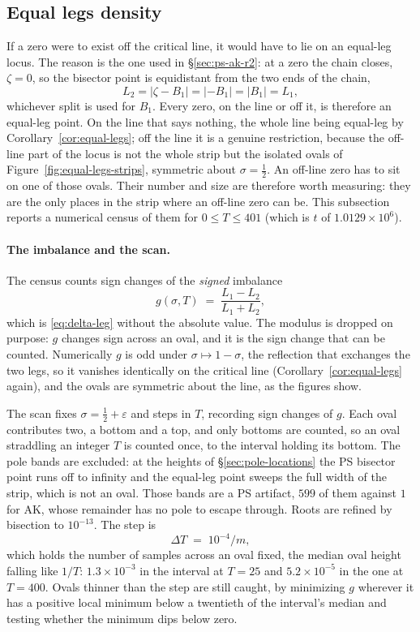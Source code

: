 \documentclass[11pt]{article}
\theoremstyle{definition}
\begin{document}
\subsection{Equal legs density}\label{sec:eqleg-density}

If a zero were to exist off the critical line, it would have to lie on an
equal-leg locus. The reason is the one used in \S\ref{sec:ps-ak-r2}: at a zero
the chain closes, $\zeta=0$, so the bisector point is equidistant from the two
ends of the chain,
\[
L_2=|\zeta-B_1|=|{-B_1}|=|B_1|=L_1 ,
\]
whichever split is used for $B_1$. Every zero, on the line or off it, is
therefore an equal-leg point. On the line that says nothing, the whole line
being equal-leg by Corollary~\ref{cor:equal-legs}; off the line it is a genuine
restriction, because the off-line part of the locus is not the whole strip but
the isolated ovals of Figure~\ref{fig:equal-legs-strips}, symmetric about
$\sigma=\tfrac12$. An off-line zero has to sit on one of those ovals. Their
number and size are therefore worth measuring: they are the only places in the
strip where an off-line zero can be. This subsection reports a numerical census
of them for $0\le T\le401$ (which is $t$ of $1.0129\times10^{6}$).

\paragraph{The imbalance and the scan.} The census counts sign changes of the
\emph{signed} imbalance
\begin{equation}\label{eq:g-imbalance}
g(\sigma,T)\;=\;\frac{L_1-L_2}{L_1+L_2},
\end{equation}
which is \eqref{eq:delta-leg} without the absolute value. The modulus is dropped
on purpose: $g$ changes sign across an oval, and it is the sign change that can
be counted. Numerically $g$ is odd under $\sigma\mapsto1-\sigma$, the reflection
that exchanges the two legs, so it vanishes identically on the critical line
(Corollary~\ref{cor:equal-legs} again), and the ovals are symmetric about the
line, as the figures show.

The scan fixes $\sigma=\tfrac12+\varepsilon$ and steps in $T$, recording sign
changes of $g$. Each oval contributes two, a bottom and a top, and only bottoms
are counted, so an oval straddling an integer $T$ is counted once, to the interval
holding its bottom. The pole bands are excluded: at the heights of
\S\ref{sec:pole-locations} the PS bisector point runs off to infinity and the
equal-leg point sweeps the full width of the strip, which is not an oval. Those
bands are a PS artifact, $599$ of them against $1$ for AK, whose remainder has
no pole to escape through. Roots are refined by bisection to $10^{-13}$. The
step is
\begin{equation}\label{eq:oval-step}
\Delta T\;=\;10^{-4}/m ,
\end{equation}
which holds the number of samples across an oval fixed, the median oval height
falling like $1/T$: $1.3\times10^{-3}$ in the interval at $T=25$ and
$5.2\times10^{-5}$ in the one at $T=400$. Ovals thinner than the step are still caught, by minimizing $g$
wherever it has a positive local minimum below a twentieth of the interval's
median and testing whether the minimum dips below zero.
\end{document}
